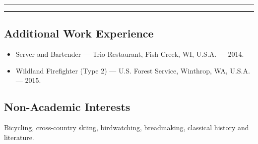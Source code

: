 \documentclass[10pt]{article}
\begin{document}
\begin{center}{\rule{2.5in}{0.5pt}}\end{center}  \begin{center}\vspace{-12pt} {\rule{2.5in}{0.5pt}}\end{center}
	
\subsection*{\textbf{Additional Work Experience}}
\begin{itemize}[label={}]
	\item Server and Bartender --- Trio Restaurant, Fish Creek, WI, U.S.A. --- 2014.
	\item Wildland Firefighter (Type 2) --- U.S. Forest Service, Winthrop, WA, U.S.A. --- 2015.
\end{itemize}


\subsection*{\textbf{Non-Academic Interests}} \hspace{5ex}
 Bicycling, cross-country skiing, birdwatching, breadmaking, classical history and literature.

\end{document}
